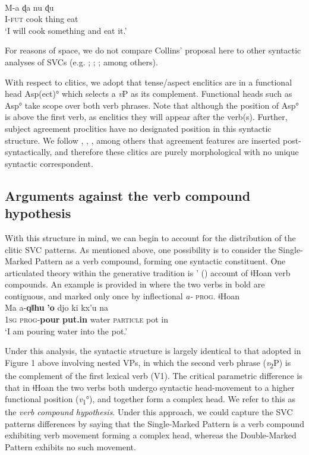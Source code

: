 \documentclass[output=paper]{langsci/langscibook}
\begin{document}
\ea\label{ex:rolle:35} \\
\gll M-a  ɖa    nu    ɖu \\
     I-\textsc{fut}  cook  thing  eat \\
\glt ‘I will cook something and eat it.’ \citep[490-491]{Collins1997}
\z

For reasons of space, we do not compare Collins’ proposal here to other syntactic analyses of SVCs (e.g. \citealt{Baker1989};  \citealt{HiraiwaBodomo2008}; \citealt{Aboh2009}; among others). 

With respect to  clitics, we adopt that tense/aspect enclitics are in a functional head Asp(ect)° which selects a \textit{v}P as its complement. Functional heads such as Asp° take scope over both verb phrases. Note that although the position of Asp° is above the first verb, as enclitics they will appear after the verb(s). Further, subject agreement proclitics have no designated position in this syntactic structure. We follow \citet{EmbickNoyer2007}, \citet{Kramer2010}, \citet{Norris2014}, among others that agreement features are inserted post-syntactically, and therefore these clitics are purely morphological with no unique syntactic correspondent. 

\subsection{Arguments against the verb compound hypothesis}
\label{bkm:Ref449523633}
With this structure in mind, we can begin to account for the distribution of the clitic SVC patterns. As mentioned above, one possibility is to consider the Single-Marked Pattern as a verb compound, forming one syntactic constituent. One articulated theory within the generative tradition is \citeauthor{Collins2002}’ (\citeyear*{Collins2002}) account of ǂHoan verb compounds. An example is provided in  where the two verbs in bold are contiguous, and marked only once by inflectional \textit{a-} \textsc{prog}.
\ea\label{ex:rolle:36} ǂHoan \\
\gll  Ma  a-\textbf{qǁhu}    \textbf{{\textbar}’o}    djo    ki      kx’u    na\\
     \textsc{1sg}   \textsc{prog}{}-\textbf{pour}  \textbf{put.in}  water  \textsc{particle}  pot    in\\
\glt ‘I am pouring water into the pot.’ \citep[1]{Collins2002}
\z

Under this analysis, the syntactic structure is largely identical to that adopted in Figure 1 above involving nested VPs, in which the second verb phrase (\textit{v}\textsubscript{2}P) is the complement of the first lexical verb (V1). The critical parametric difference is that in ǂHoan the two verbs both undergo syntactic head-movement to a higher functional position (\textit{v}\textsubscript{1}°), and together form a complex head. We refer to this as the \textit{verb compound hypothesis}. Under this approach, we could capture the SVC patterns differences by saying that the Single-Marked Pattern is a verb compound exhibiting verb movement forming a complex head, whereas the Double-Marked Pattern exhibits no such movement. 
\end{document}
